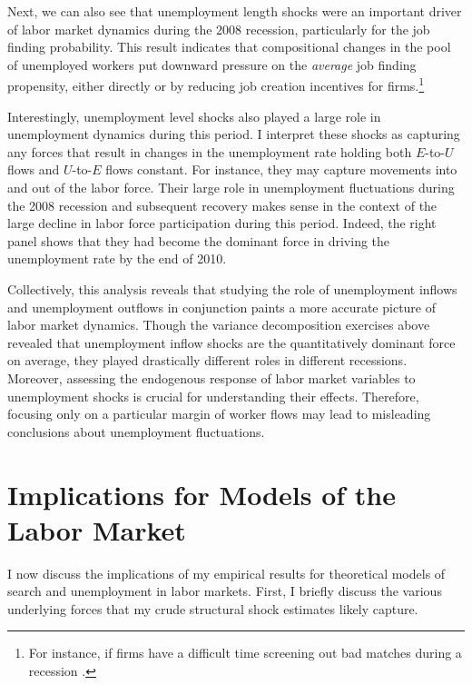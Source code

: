 \documentclass[12pt]{article}
\begin{document}
Next, we can also see that unemployment length shocks were an important driver of labor market dynamics during the 2008 recession, particularly for the job finding probability. This result indicates that compositional changes in the pool of unemployed workers put downward pressure on the \textit{average} job finding propensity, either directly or by reducing job creation incentives for firms.\footnote{For instance, if firms have a difficult time screening out bad matches during a recession \citep{Engbom:2021aa}.}

Interestingly, unemployment level shocks also played a large role in unemployment dynamics during this period. I interpret these shocks as capturing any forces that result in changes in the unemployment rate holding both $E$-to-$U$ flows and $U$-to-$E$ flows constant. For instance, they may capture movements into and out of the labor force. Their large role in unemployment fluctuations during the 2008 recession and subsequent recovery makes sense in the context of the large decline in labor force participation during this period. Indeed, the right panel shows that they had become the dominant force in driving the unemployment rate by the end of 2010.

Collectively, this analysis reveals that studying the role of unemployment inflows and unemployment outflows in conjunction paints a more accurate picture of labor market dynamics. Though the variance decomposition exercises above revealed that unemployment inflow shocks are the quantitatively dominant force on average, they played drastically different roles in different recessions. Moreover, assessing the endogenous response of labor market variables to unemployment shocks is crucial for understanding their effects. Therefore, focusing only on a particular margin of worker flows may lead to misleading conclusions about unemployment fluctuations.

\section{Implications for Models of the Labor Market}\label{sec:implications}

I now discuss the implications of my empirical results for theoretical models of search and unemployment in labor markets. First, I briefly discuss the various underlying forces that my crude structural shock estimates likely capture. 
\end{document}
